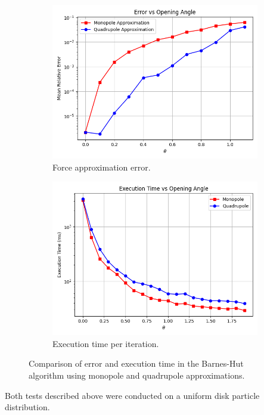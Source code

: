 \begin{figure}[htp]
    \centering
    \begin{subfigure}[b]{0.47\textwidth}
        \centering
        \includegraphics[width=\textwidth]{chapters/barnes-hut/img/error-vs-theta.png}
        \caption{Force approximation error.}
        \label{fig:bh-force-error}
    \end{subfigure}
    \hfill
    \begin{subfigure}[b]{0.47\textwidth}
        \centering
        \includegraphics[width=\textwidth]{chapters/barnes-hut/img/bh-time.png}
        \caption{Execution time per iteration.}
        \label{fig:bh-time}
    \end{subfigure}
    \caption{Comparison of error and execution time in the Barnes-Hut algorithm using monopole and quadrupole approximations.}
    \label{fig:bh-analysis}
\end{figure}
Both tests described above were conducted on a uniform disk particle distribution.

